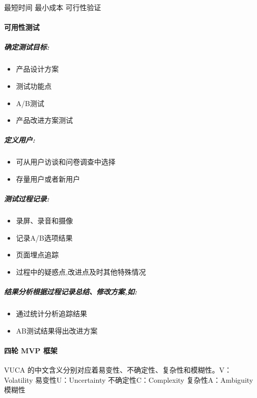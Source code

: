 \documentclass[letterpaper,11pt,english]{sphinxmanual}
\begin{document}
最短时间 最小成本 可行性验证


\paragraph{可用性测试}
\label{\detokenize{chapter_skill/BRD:id10}}

\subparagraph{确定测试目标:}
\label{\detokenize{chapter_skill/BRD:id11}}\begin{itemize}
\item {} 
产品设计方案

\item {} 
测试功能点

\item {} 
A/B测试

\item {} 
产品改进方案测试

\end{itemize}


\subparagraph{定义用户:}
\label{\detokenize{chapter_skill/BRD:id12}}\begin{itemize}
\item {} 
可从用户访谈和问卷调查中选择

\item {} 
存量用户或者新用户

\end{itemize}


\subparagraph{测试过程记录:}
\label{\detokenize{chapter_skill/BRD:id13}}\begin{itemize}
\item {} 
录屏、录音和摄像

\item {} 
记录A/B选项结果

\item {} 
页面埋点追踪

\item {} 
过程中的疑惑点,改进点及时其他特殊情况

\end{itemize}


\subparagraph{结果分析根据过程记录总结、修改方案,如:}
\label{\detokenize{chapter_skill/BRD:id14}}\begin{itemize}
\item {} 
通过统计分析追踪结果

\item {} 
AB测试结果得出改进方案

\end{itemize}


\paragraph{四轮 MVP 框架}
\label{\detokenize{chapter_skill/BRD:mvp}}
VUCA 的中文含义分别对应着易变性、不确定性、复杂性和模糊性。V：Volatility
易变性U：Uncertainty 不确定性C：Complexity 复杂性A：Ambiguity 模糊性
\end{document}
